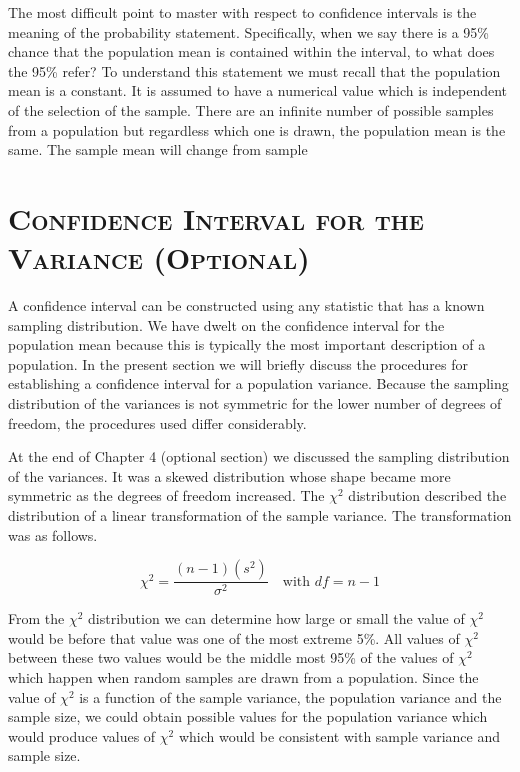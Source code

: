 \documentclass[12pt]{article}
\begin{document}
The most difficult point to master with respect to confidence intervals is the
meaning of the probability statement. Specifically, when we say there is a 95\% chance that
the population mean is contained within the interval, to what does the 95\% refer? To
understand this statement we must recall that the population mean is a constant. It is
assumed to have a numerical value which is independent of the selection of the sample.
There are an infinite number of possible samples from a population but regardless which
one is drawn, the population mean is the same. The sample mean will change from sample

\newpage


\section*{\textsc{Confidence Interval for the Variance (Optional)}}

A confidence interval can be constructed using any statistic that has a known sampling distribution. We have dwelt on the confidence interval for the population mean because this is typically the most important description of a population. In the present section we will briefly discuss the procedures for establishing a confidence interval for a population variance. Because the sampling distribution of the variances is not symmetric for the lower number of degrees of freedom, the procedures used differ considerably.

At the end of Chapter 4 (optional section) we discussed the sampling distribution of the variances. It was a skewed distribution whose shape became more symmetric as the degrees of freedom increased. The $\chi^2$ distribution described the distribution of a linear transformation of the sample variance. The transformation was as follows.

\[
\chi^2 = \frac{(n-1)(s^2)}{\sigma^2} \quad \text{with } df = n - 1
\]

From the $\chi^2$ distribution we can determine how large or small the value of $\chi^2$ would be before that value was one of the most extreme 5\%. All values of $\chi^2$ between these two values would be the middle most 95\% of the values of $\chi^2$ which happen when random samples are drawn from a population. Since the value of $\chi^2$ is a function of the sample variance, the population variance and the sample size, we could obtain possible values for the population variance which would produce values of $\chi^2$ which would be consistent with sample variance and sample size.
\end{document}
